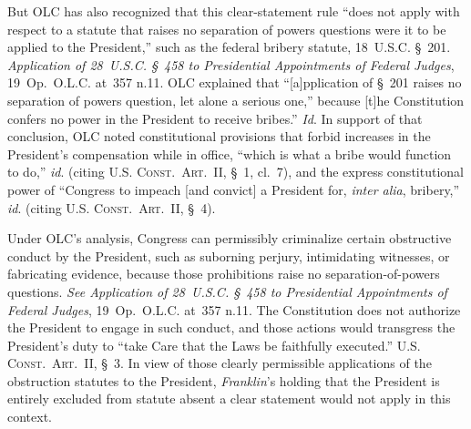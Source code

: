 But OLC has also recognized that this clear-statement rule ``does not apply with respect to a statute that raises no separation of powers questions were it to be applied to the President,'' such as the federal bribery statute, 18~U.S.C. \S~201.
\textit{Application of 28~U.S.C. \S~458 to Presidential Appointments of Federal Judges}, 19~Op.\ O.L.C. at~357 n.11. OLC explained that ``[a]pplication of \S~201 raises no separation of powers question, let alone a serious one,'' because [t]he Constitution confers no power in the President to receive bribes.'' \textit{Id}.
In support of that conclusion, OLC noted constitutional provisions that forbid increases in the President's compensation while in office, ``which is what a bribe would function to do,'' \textit{id}. (citing \textsc{U.S. Const.\ Art.~II}, \S~1, cl.~7), and the express constitutional power of ``Congress to impeach [and convict] a President for, \textit{inter alia}, bribery,'' \textit{id}. (citing \textsc{U.S. Const.\ Art.~II}, \S~4).

Under OLC's analysis, Congress can permissibly criminalize certain obstructive conduct by the President, such as suborning perjury, intimidating witnesses, or fabricating evidence, because those prohibitions raise no separation-of-powers questions.
\textit{See Application of 28~U.S.C. \S~458 to Presidential Appointments of Federal Judges}, 19~Op.\ O.L.C. at~357 n.11.
The Constitution does not authorize the President to engage in such conduct, and those actions would transgress the President's duty to ``take Care that the Laws be faithfully executed.''
\textsc{U.S. Const.\ Art.~II}, \S~3.
In view of those clearly permissible applications of the obstruction statutes to the President, \textit{Franklin}'s holding that the President is entirely excluded from statute absent a clear statement would not apply in this context.

